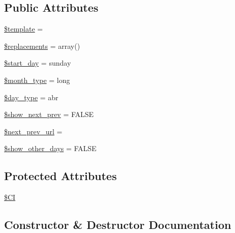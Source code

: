\subsection*{Public Attributes}
\begin{DoxyCompactItemize}
\item 
\mbox{\hyperlink{class_c_i___calendar_aa3e9534005fd516d941f6a5569896e01}{\$template}} = \textquotesingle{}\textquotesingle{}
\item 
\mbox{\hyperlink{class_c_i___calendar_a93cb3f67ace379a71de4fb00bcc7a605}{\$replacements}} = array()
\item 
\mbox{\hyperlink{class_c_i___calendar_ac4e461505bb7cd9a2fdb2bf47560a389}{\$start\+\_\+day}} = \textquotesingle{}sunday\textquotesingle{}
\item 
\mbox{\hyperlink{class_c_i___calendar_ab40961ce0a0e4a7ee10ad389c9566b28}{\$month\+\_\+type}} = \textquotesingle{}long\textquotesingle{}
\item 
\mbox{\hyperlink{class_c_i___calendar_a1e35fdb6b6cc297a6bb256517a8d813d}{\$day\+\_\+type}} = \textquotesingle{}abr\textquotesingle{}
\item 
\mbox{\hyperlink{class_c_i___calendar_aeade2ffe515604c0dffb78d32ca846ae}{\$show\+\_\+next\+\_\+prev}} = F\+A\+L\+SE
\item 
\mbox{\hyperlink{class_c_i___calendar_a3ed0df912e3e67eb17d432c1f54ae2de}{\$next\+\_\+prev\+\_\+url}} = \textquotesingle{}\textquotesingle{}
\item 
\mbox{\hyperlink{class_c_i___calendar_a52c552ab98b51789690522ff7d41ecb7}{\$show\+\_\+other\+\_\+days}} = F\+A\+L\+SE
\end{DoxyCompactItemize}
\subsection*{Protected Attributes}
\begin{DoxyCompactItemize}
\item 
\mbox{\hyperlink{class_c_i___calendar_ae0314d046ddf7fcfaec03222977427d3}{\$\+CI}}
\end{DoxyCompactItemize}


\subsection{Constructor \& Destructor Documentation}
\mbox{\label{class_c_i___calendar_af7f9493844d2d66e924e3c1df51ce616}} 
